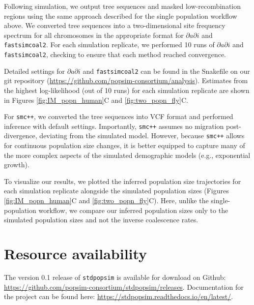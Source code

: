 \documentclass[12pt,halfline,a4paper]{ouparticle}
\newcommand{\stdpopsim}{\texttt{stdpopsim}\xspace}
\newcommand{\dadi}{$\partial a \partial i$\xspace}
\newcommand{\smcpp}{\texttt{smc++}\xspace}
\newcommand{\fastsimcoal}{\texttt{fastsimcoal2}\xspace}
\begin{document}
Following simulation, we output tree sequences and masked low-recombination
regions using the same approach described for the single population workflow above. We
converted tree sequences into a two-dimensional site frequency spectrum for all
chromosomes in the appropriate format for \dadi and \fastsimcoal.
For each simulation
replicate, we performed 10 runs of \dadi and \fastsimcoal, checking to ensure that
each method reached convergence.

Detailed settings for \dadi and \fastsimcoal can be found in the Snakefile
on our git repository (\url{https://github.com/popsim-consortium/analysis}).
Estimates from the highest log-likelihood (out of 10 runs) for each simulation replicate
are shown in Figures \ref{fig:IM_popn_human}C and \ref{fig:two_popn_fly}C.

For \smcpp, we converted the tree sequences into VCF format and performed inference
with default settings. Importantly, \smcpp assumes no migration post-divergence,
deviating from the simulated model.  However, because \smcpp allows
for continuous population size changes, it is better equipped to capture many of the
more complex aspects of the simulated demographic models (e.g., exponential growth).

To visualize our results, we plotted the inferred population size trajectories
for each simulation replicate alongside the simulated population sizes
(Figures \ref{fig:IM_popn_human}C and \ref{fig:two_popn_fly}C).
Here, unlike the single-population workflow,
we compare our inferred population sizes only to the simulated population
sizes and not the inverse coalescence rates.

\section*{Resource availability}
The version 0.1 release of \stdpopsim is available for download on Github:
\url{https://github.com/popsim-consortium/stdpopsim/releases}.
Documentation for the project can be found here:
\url{https://stdpopsim.readthedocs.io/en/latest/}.
\end{document}
